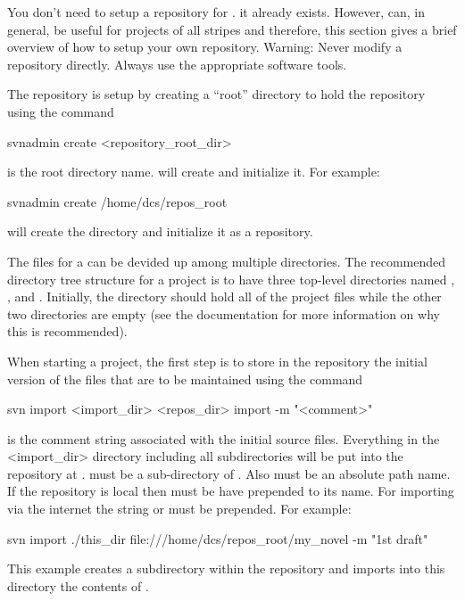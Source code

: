You don't need to setup a \svn repository for \bmad. it already
exists. However, \svn can, in general, be useful for projects of all
stripes and therefore, this
section gives a brief overview of how to setup your own \svn
repository. Warning: Never modify a repository directly. Always use
the appropriate software tools.

The \svn repository is setup by creating a ``root'' directory
to hold the repository using the command
\begin{example}
  svnadmin create <repository_root_dir> 
\end{example}
 is the root directory name. \svn will create
 and initialize it. For example:
\begin{example}
  svnadmin create /home/dcs/repos_root
\end{example}
will create the  directory and initialize it as a \svn repository.

The files for a  can be devided up among multiple directories. 
The recommended directory tree structure for a project is to have three 
top-level directories named , , and . 
Initially, the  directory should hold all of the project files
while the other two directories are empty (see the \svn documentation for
more information on why this is recommended).

When starting a project, the first step is to store in the repository
the initial version of the 
files that are to be maintained using the command
\begin{example}
  svn import <import_dir> <repos_dir> import -m "<comment>" 
\end{example}
 is the comment string associated with the initial source
files. Everything in the <import_dir> directory including all
subdirectories will be put into the \svn repository at
.  must be a
sub-directory of . Also
 must be an absolute path name. If the \svn
repository is local then  must be have
 prepended to its name. For importing via the internet the
string  or  must be prepended. For example:
\begin{example}
  svn import ./this_dir file:///home/dcs/repos_root/my_novel -m "1st draft"
\end{example}
This example creates a subdirectory  within
the repository and imports into this directory the contents of .

